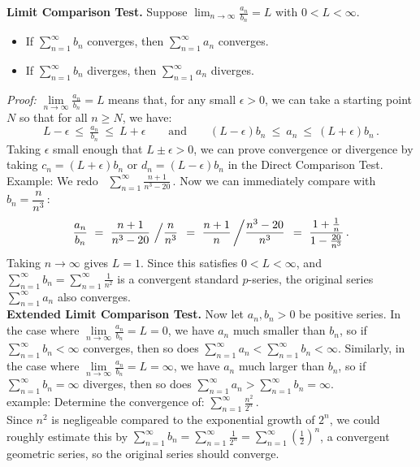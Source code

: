 \documentclass[11pt]{article}
\newcommand{\ds}{\displaystyle}
\begin{document}
\pagebreak

\noindent
{\bf Limit Comparison Test.}
Suppose $\lim_{n\to\infty} \frac{a_n}{b_n} = L$ with $0<L<\infty$.
\begin{itemize}

\item If $\sum\limits_{n=1}^\infty b_n$ converges, then $\sum\limits_{n=1}^\infty a_n$ converges.

\item If $\sum\limits_{n=1}^\infty b_n$ diverges, then $\sum\limits_{n=1}^\infty a_n$ diverges.
\end{itemize}
%
{\small 
{\it Proof:} $\lim\limits_{n\to\infty} \frac{a_n}{b_n} = L$ means that, 
for any small $\epsilon>0$, 
we can take a starting point $N$ so that  for all $n\geq N$, we have:
$$
L{-}\epsilon \ \leq\ \tfrac{a_n}{b_n} \ \leq\ L{+}\epsilon
\qquad\text{and}\qquad
(L{-}\epsilon) b_n \ \leq\ a_n \ \leq\ (L{+}\epsilon) b_n\,.
$$ 
Taking $\epsilon$ small enough that $L{\pm}\epsilon>0$, 
we can prove convergence or divergence
by taking $c_n=(L{+}\epsilon) b_n$ or
$d_n=(L{-}\epsilon) b_n$ in the Direct Comparison Test.
}
\\[.5em]
{\sc Example:} We redo \  
$\ds\sum\limits_{n=1}^\infty \frac{n+1}{n^3 - 20}$\,.
Now we can immediately compare with $b_n =\dfrac{n}{n^3}$\,:
$$
\frac{a_n}{b_n}
\ =\
\frac{n+1}{n^3 - 20}\,\left/\frac{n}{n^3}\right.
\ =\
\frac{n+1}{n}\left/\frac{n^3-20}{n^3}\right.
\ =\
\frac{1+\frac1n}{1-\frac{20}{n^3}}\,.
$$
Taking $n\to\infty$ gives $L=1$. 
Since this satisfies $0<L<\infty$,  
and $\sum_{n=1}^\infty b_n=\sum_{n=1}^\infty \frac1{n^2}$ 
is a convergent standard $p$-series, the original series
$\sum_{n=1}^\infty a_n$ also converges.
\\[1em]
{\bf Extended Limit Comparison Test.} Now let $a_n,b_n> 0$ be positive series.
In the case where $\lim\limits_{n\to\infty}\frac{a_n}{b_n}=L=0$,
we have $a_n$ much smaller than $b_n$, so if $\sum_{n=1}^\infty b_n<\infty$ converges, then so does  $\sum_{n=1}^\infty a_n<\sum_{n=1}^\infty b_n<\infty$. 
Similarly, in the case where $\lim\limits_{n\to\infty}\frac{a_n}{b_n}=L=\infty$,
we have $a_n$ much larger than $b_n$, so if $\sum_{n=1}^\infty b_n=\infty$ diverges, then so does  $\sum_{n=1}^\infty a_n>\sum_{n=1}^\infty b_n=\infty$.
\\[.5em]
{\sc example:} Determine the convergence of:  $\ds\sum_{n=1}^\infty \frac{n^2}{2^n}$\,. 
\\
Since $n^2$ is negligeable compared to the exponential growth of $2^n$,
we could roughly estimate this by $\sum_{n=1}^\infty b_n = \sum_{n=1}^\infty \frac{1}{2^n}
= \sum_{n=1}^\infty \left(\frac 12\right)^{\!n}$, 
a convergent geometric series, so the original series should converge.
\end{document}
